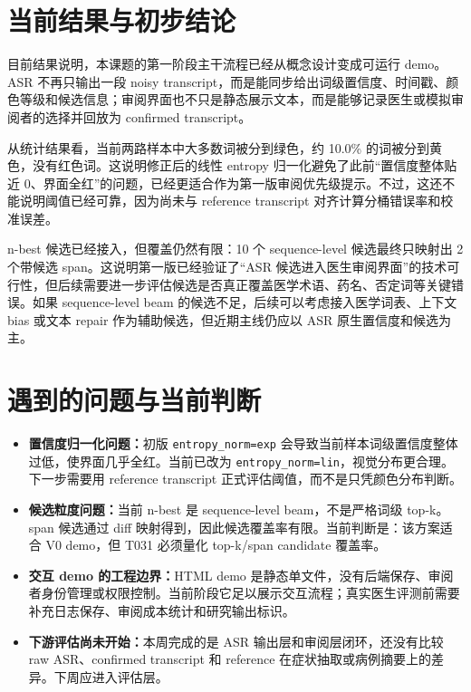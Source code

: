 \documentclass[UTF8,a4paper,12pt]{ctexart}
\begin{document}
\section{当前结果与初步结论}

目前结果说明，本课题的第一阶段主干流程已经从概念设计变成可运行 demo。ASR 不再只输出一段 noisy transcript，而是能同步给出词级置信度、时间戳、颜色等级和候选信息；审阅界面也不只是静态展示文本，而是能够记录医生或模拟审阅者的选择并回放为 confirmed transcript。

从统计结果看，当前两路样本中大多数词被分到绿色，约 10.0\% 的词被分到黄色，没有红色词。这说明修正后的线性 entropy 归一化避免了此前“置信度整体贴近 0、界面全红”的问题，已经更适合作为第一版审阅优先级提示。不过，这还不能说明阈值已经可靠，因为尚未与 reference transcript 对齐计算分桶错误率和校准误差。

n-best 候选已经接入，但覆盖仍然有限：10 个 sequence-level 候选最终只映射出 2 个带候选 span。这说明第一版已经验证了“ASR 候选进入医生审阅界面”的技术可行性，但后续需要进一步评估候选是否真正覆盖医学术语、药名、否定词等关键错误。如果 sequence-level beam 的候选不足，后续可以考虑接入医学词表、上下文 bias 或文本 repair 作为辅助候选，但近期主线仍应以 ASR 原生置信度和候选为主。

\section{遇到的问题与当前判断}

\begin{itemize}
  \item \textbf{置信度归一化问题：}初版 \texttt{entropy\_norm=exp} 会导致当前样本词级置信度整体过低，使界面几乎全红。当前已改为 \texttt{entropy\_norm=lin}，视觉分布更合理。下一步需要用 reference transcript 正式评估阈值，而不是只凭颜色分布判断。
  \item \textbf{候选粒度问题：}当前 n-best 是 sequence-level beam，不是严格词级 top-k。span 候选通过 diff 映射得到，因此候选覆盖率有限。当前判断是：该方案适合 V0 demo，但 T031 必须量化 top-k/span candidate 覆盖率。
  \item \textbf{交互 demo 的工程边界：}HTML demo 是静态单文件，没有后端保存、审阅者身份管理或权限控制。当前阶段它足以展示交互流程；真实医生评测前需要补充日志保存、审阅成本统计和研究输出标识。
  \item \textbf{下游评估尚未开始：}本周完成的是 ASR 输出层和审阅层闭环，还没有比较 raw ASR、confirmed transcript 和 reference 在症状抽取或病例摘要上的差异。下周应进入评估层。
\end{itemize}
\end{document}
